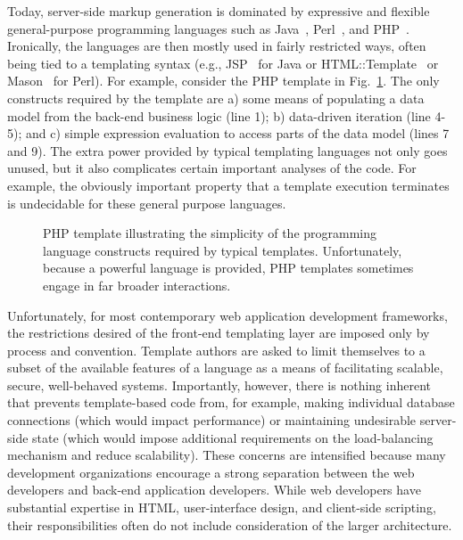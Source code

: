 \documentclass{www2003-submission}
\newcommand{\figref}[1]{Fig.~\ref{fig-#1}}
\begin{document}
Today, server-side markup generation is dominated by expressive and
flexible general-purpose programming languages such as
Java~\cite{Arnold98}, Perl~\cite{Camel3rd}, and PHP~\cite{pro_php}.
Ironically, the languages are then mostly used
in fairly restricted ways, often being tied to a templating syntax
(e.g., JSP~\cite{JSP12} for Java or
HTML::Template~\cite{HTML-Template} or Mason~\cite{Perl-Mason} for
Perl).  For example, consider the PHP template in \figref{php-books}.
The only constructs required by the template are a) some means of
populating a data model from the back-end business logic (line 1); b)
data-driven iteration (line 4-5); and c) simple expression evaluation
to access parts of the data model (lines 7 and 9). The extra power
provided by typical templating languages not only goes unused, but it
also complicates certain important analyses of the code.  For example,
the obviously important property that a template execution terminates
is undecidable for these general purpose languages.  


\begin{figure}[tb]
\caption{PHP template illustrating the simplicity of the programming
language constructs required by typical templates.  Unfortunately,
because a powerful language is provided, PHP templates sometimes engage
in far broader interactions.
\label{fig-php-books}}
\end{figure}

Unfortunately, for most contemporary web application development
frameworks, the restrictions desired of the front-end templating layer
are imposed only by process and convention.  Template authors are
asked to limit themselves to a subset of the available features of a
language as a means of facilitating scalable, secure, well-behaved
systems.  Importantly, however, there is nothing inherent that
prevents template-based code from, for example, making individual
database connections (which would impact performance) or maintaining
undesirable server-side state (which would impose additional
requirements on the load-balancing mechanism and reduce scalability).
These concerns are intensified because many development organizations
encourage a strong separation between the web developers and back-end
application developers. While web developers have substantial
expertise in HTML, user-interface design, and client-side scripting,
their responsibilities often do not include consideration of the
larger architecture.
\end{document}
